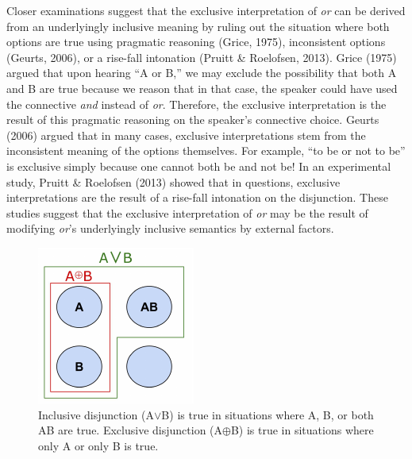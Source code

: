 \documentclass[10pt, letterpaper]{article}
\newenvironment{CodeChunk}{}{}
\begin{document}
Closer examinations suggest that the exclusive interpretation of
\emph{or} can be derived from an underlyingly inclusive meaning by
ruling out the situation where both options are true using pragmatic
reasoning (Grice, 1975), inconsistent options (Geurts, 2006), or a
rise-fall intonation (Pruitt \& Roelofsen, 2013). Grice (1975) argued
that upon hearing ``A or B,'' we may exclude the possibility that both A
and B are true because we reason that in that case, the speaker could
have used the connective \emph{and} instead of \emph{or}. Therefore, the
exclusive interpretation is the result of this pragmatic reasoning on
the speaker's connective choice. Geurts (2006) argued that in many
cases, exclusive interpretations stem from the inconsistent meaning of
the options themselves. For example, ``to be or not to be'' is exclusive
simply because one cannot both be and not be! In an experimental study,
Pruitt \& Roelofsen (2013) showed that in questions, exclusive
interpretations are the result of a rise-fall intonation on the
disjunction. These studies suggest that the exclusive interpretation of
\emph{or} may be the result of modifying \emph{or}'s underlyingly
inclusive semantics by external factors.

\begin{CodeChunk}
\begin{figure}[t]

{\centering \includegraphics{figs/aorb-1} 

}

\caption[Inclusive disjunction (A$\vee$B) is true in situations where A, B, or both AB are true]{Inclusive disjunction (A$\vee$B) is true in situations where A, B, or both AB are true. Exclusive disjunction (A$\oplus$B) is true in situations where only A or only B is true.}\label{fig:aorb}
\end{figure}
\end{CodeChunk}
\end{document}
